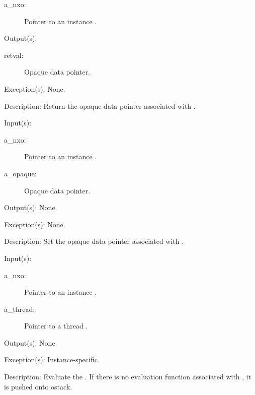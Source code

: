 \begin{capi}
\begin{capilist}
		\begin{description}\item[]
		\item[a\_nxo: ]
			Pointer to an instance .
		\end{description}
	\item[Output(s): ]
		\begin{description}\item[]
		\item[retval: ]
			Opaque data pointer.
		\end{description}
	\item[Exception(s): ] None.
	\item[Description: ]
		Return the opaque data pointer associated with .
	\end{capilist}
\label{nxo_instance_opaque_set}
	\begin{capilist}
	\item[Input(s): ]
		\begin{description}\item[]
		\item[a\_nxo: ]
			Pointer to an instance .
		\item[a\_opaque: ]
			Opaque data pointer.
		\end{description}
	\item[Output(s): ] None.
	\item[Exception(s): ] None.
	\item[Description: ]
		Set the opaque data pointer associated with .
	\end{capilist}
\label{nxo_instance_eval}
	\begin{capilist}
	\item[Input(s): ]
		\begin{description}\item[]
		\item[a\_nxo: ]
			Pointer to an instance \classname{nxo}.
		\item[a\_thread: ]
			Pointer to a thread \classname{nxo}.
		\end{description}
	\item[Output(s): ] None.
	\item[Exception(s): ] Instance-specific.
	\item[Description: ]
		Evaluate the .  If there is no evaluation function
		associated with , it is pushed onto ostack.
	\end{capilist}
\end{capi}
